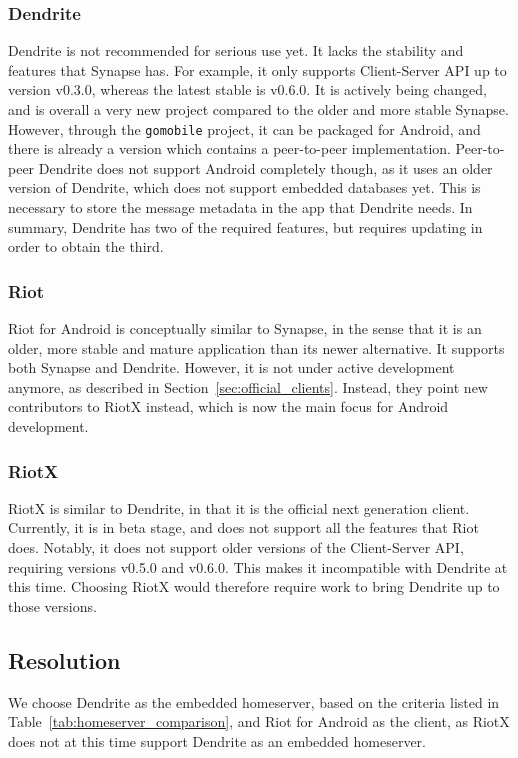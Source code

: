 \subsubsection{Dendrite}
Dendrite is not recommended for serious use yet.
It lacks the stability and features that Synapse has.
For example, it only supports Client-Server API up to version v0.3.0, whereas the latest stable is v0.6.0.
It is actively being changed, and is overall a very new project compared to the older and more stable Synapse.
However, through the \texttt{gomobile} project, it can be packaged for Android, and there is already a version which contains a peer-to-peer implementation.
Peer-to-peer Dendrite does not support Android completely though, as it uses an older version of Dendrite, which does not support embedded databases yet.
This is necessary to store the message metadata in the app that Dendrite needs.
In summary, Dendrite has two of the required features, but requires updating in order to obtain the third.

\subsubsection{Riot}
Riot for Android is conceptually similar to Synapse, in the sense that it is an older, more stable and mature application than its newer alternative.
It supports both Synapse and Dendrite.
However, it is not under active development anymore, as described in Section~\ref{sec:official_clients}.
Instead, they point new contributors to RiotX instead, which is now the main focus for Android development.

\subsubsection{RiotX}
RiotX is similar to Dendrite, in that it is the official next generation client.
Currently, it is in beta stage, and does not support all the features that Riot does.
Notably, it does not support older versions of the Client-Server API, requiring versions v0.5.0 and v0.6.0.
This makes it incompatible with Dendrite at this time.
Choosing RiotX would therefore require work to bring Dendrite up to those versions.

\subsection{Resolution}
We choose Dendrite as the embedded homeserver, based on the criteria listed in Table~\ref{tab:homeserver_comparison}, and Riot for Android as the client, as RiotX does not at this time support Dendrite as an embedded homeserver.

